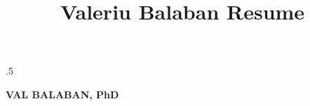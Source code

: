 \documentclass[11pt]{article}
\title{Valeriu Balaban Resume}
\begin{document}
\pagecolor{black!5!white}

\thispagestyle{fancy}

\moveleft.5\hoffset\centerline{\textbf{\huge VAL BALABAN, PhD}}
\vspace{2mm}


\end{document}
